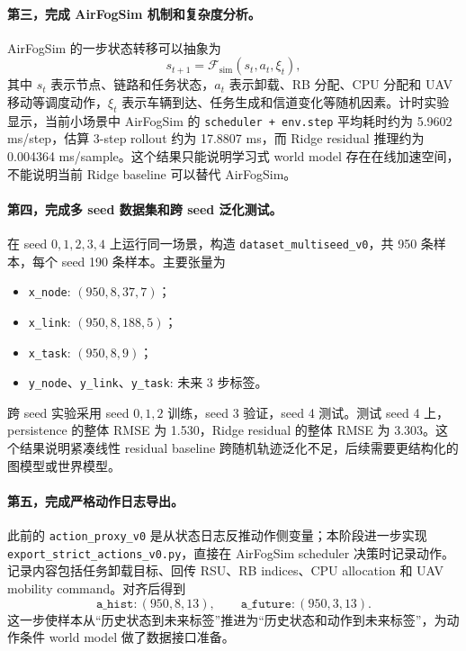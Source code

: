 ﻿\documentclass[UTF8,a4paper,11pt]{ctexart}
\newcommand{\code}[1]{\texttt{#1}}
\begin{document}
\paragraph{第三，完成 AirFogSim 机制和复杂度分析。}
AirFogSim 的一步状态转移可以抽象为
\begin{equation}
s_{t+1}=\mathcal{F}_{\mathrm{sim}}(s_t,a_t,\xi_t),
\end{equation}
其中 $s_t$ 表示节点、链路和任务状态，$a_t$ 表示卸载、RB 分配、CPU 分配和 UAV 移动等调度动作，$\xi_t$ 表示车辆到达、任务生成和信道变化等随机因素。计时实验显示，当前小场景中 AirFogSim 的 \code{scheduler + env.step} 平均耗时约为 5.9602 ms/step，估算 3-step rollout 约为 17.8807 ms，而 Ridge residual 推理约为 0.004364 ms/sample。这个结果只能说明学习式 world model 存在在线加速空间，不能说明当前 Ridge baseline 可以替代 AirFogSim。

\paragraph{第四，完成多 seed 数据集和跨 seed 泛化测试。}
在 seed $0,1,2,3,4$ 上运行同一场景，构造 \code{dataset\_multiseed\_v0}，共 950 条样本，每个 seed 190 条样本。主要张量为
\begin{itemize}
  \item \code{x\_node}: $(950,8,37,7)$；
  \item \code{x\_link}: $(950,8,188,5)$；
  \item \code{x\_task}: $(950,8,9)$；
  \item \code{y\_node}、\code{y\_link}、\code{y\_task}: 未来 3 步标签。
\end{itemize}
跨 seed 实验采用 seed $0,1,2$ 训练，seed 3 验证，seed 4 测试。测试 seed 4 上，persistence 的整体 RMSE 为 1.530，Ridge residual 的整体 RMSE 为 3.303。这个结果说明紧凑线性 residual baseline 跨随机轨迹泛化不足，后续需要更结构化的图模型或世界模型。

\paragraph{第五，完成严格动作日志导出。}
此前的 \code{action\_proxy\_v0} 是从状态日志反推动作侧变量；本阶段进一步实现 \code{export\_strict\_actions\_v0.py}，直接在 AirFogSim scheduler 决策时记录动作。记录内容包括任务卸载目标、回传 RSU、RB indices、CPU allocation 和 UAV mobility command。对齐后得到
\begin{equation}
\code{a\_hist}: (950,8,13),\qquad
\code{a\_future}: (950,3,13).
\end{equation}
这一步使样本从“历史状态到未来标签”推进为“历史状态和动作到未来标签”，为动作条件 world model 做了数据接口准备。
\end{document}
